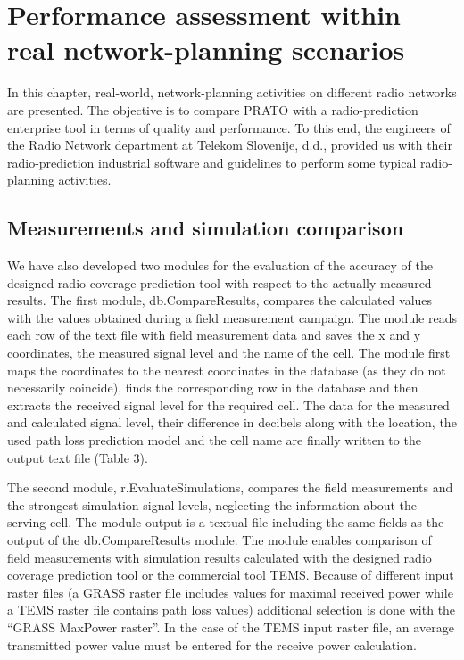 
\chapter{Performance assessment within real network-planning scenarios \label{chap:08-Real-world_network_planning}}


\noindent In this chapter, real-world, network-planning activities
on different radio networks are presented. The objective is to compare
PRATO with a radio-prediction enterprise tool in terms of quality
and performance. To this end, the engineers of the Radio Network department
at Telekom Slovenije, d.d., provided us with their radio-prediction
industrial software and guidelines to perform some typical radio-planning
activities.




\section{Measurements and simulation comparison}

We have also developed two modules for the evaluation of the accuracy
of the designed radio coverage prediction tool with respect to the
actually measured results. The first module, db.CompareResults, compares
the calculated values with the values obtained during a field measurement
campaign. The module reads each row of the text file with field measurement
data and saves the x and y coordinates, the measured signal level
and the name of the cell. The module first maps the coordinates to
the nearest coordinates in the database (as they do not necessarily
coincide), finds the corresponding row in the database and then extracts
the received signal level for the required cell. The data for the
measured and calculated signal level, their difference in decibels
along with the location, the used path loss prediction model and the
cell name are finally written to the output text file (Table 3).

The second module, r.EvaluateSimulations, compares the field measurements
and the strongest simulation signal levels, neglecting the information
about the serving cell. The module output is a textual file including
the same fields as the output of the db.CompareResults module. The
module enables comparison of field measurements with simulation results
calculated with the designed radio coverage prediction tool or the
commercial tool TEMS. Because of different input raster files (a GRASS
raster file includes values for maximal received power while a TEMS
raster file contains path loss values) additional selection is done
with the \textquotedblleft{}GRASS MaxPower raster\textquotedblright{}.
In the case of the TEMS input raster file, an average transmitted
power value must be entered for the receive power calculation.


